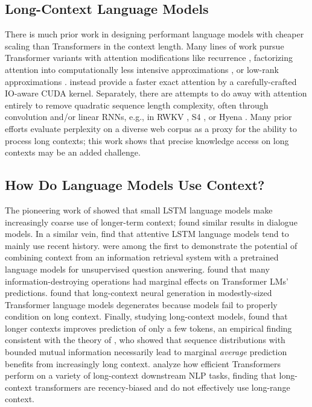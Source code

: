 \documentclass[11pt,a4paper]{article}
\begin{document}
\subsection{Long-Context Language Models}
There is much prior work in designing performant language models with cheaper scaling than Transformers in the context length.
Many lines of work pursue Transformer variants with attention modifications like recurrence \cite{dai-etal-2019-transformer}, factorizing attention into computationally less intensive approximations \cite{beltagy2020longformer,zaheer2020big}, or low-rank approximations \cite{Wang2020LinformerSW,peng2021random}.
\citet{dao2022flashattention} instead provide a faster exact attention by a carefully-crafted IO-aware CUDA kernel.
Separately, there are attempts to do away with attention entirely to remove quadratic sequence length complexity, often through convolution and/or linear RNNs, e.g., in RWKV \cite{PENG_RWKV-LM_2021}, S4 \cite{gu2022efficiently}, or Hyena \cite{poli2023hyena}.
Many prior efforts evaluate perplexity on a diverse web corpus as a proxy for the ability to process long contexts; this work shows that precise knowledge access on long contexts may be an added challenge.


\subsection{How Do Language Models Use Context?}
The pioneering work of \citet{khandelwal-etal-2018-sharp} showed that small LSTM language models make increasingly coarse use of longer-term context; \citet{sankar2019neural} found similar results in dialogue models.
In a similar vein, \citet{daniluk2017frustratingly} find that attentive LSTM language models tend to mainly use recent history.
\citet{petroni2020context} were among the first to demonstrate the potential of combining context from an information retrieval system with a pretrained language models for unsupervised question answering.
\citet{oconnor-andreas-2021-context} found that many information-destroying operations had marginal effects on Transformer LMs' predictions.
\citet{krishna2022rankgen} found that long-context neural generation in modestly-sized Transformer language models degenerates because models fail to properly condition on long context.
Finally, studying long-context models, \citet{sun-etal-2021-long} found that longer contexts improves prediction of only a few tokens, an empirical finding consistent with the theory of \citet{sharan2018prediction}, who showed that sequence distributions with bounded mutual information necessarily lead to marginal \textit{average} prediction benefits from increasingly long context.
\citet{qin-etal-2023-nlp} analyze how efficient Transformers perform on a variety of long-context downstream NLP tasks, finding that long-context transformers are recency-biased and do not effectively use long-range context.
\end{document}
